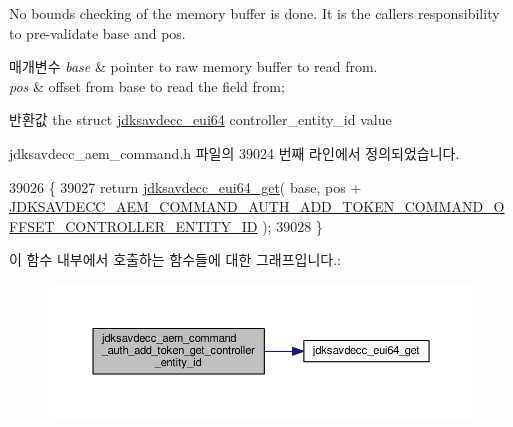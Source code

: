 No bounds checking of the memory buffer is done. It is the caller\textquotesingle{}s responsibility to pre-\/validate base and pos.


\begin{DoxyParams}{매개변수}
{\em base} & pointer to raw memory buffer to read from. \\
\hline
{\em pos} & offset from base to read the field from; \\
\hline
\end{DoxyParams}
\begin{DoxyReturn}{반환값}
the struct \hyperlink{structjdksavdecc__eui64}{jdksavdecc\+\_\+eui64} controller\+\_\+entity\+\_\+id value 
\end{DoxyReturn}


jdksavdecc\+\_\+aem\+\_\+command.\+h 파일의 39024 번째 라인에서 정의되었습니다.


\begin{DoxyCode}
39026 \{
39027     \textcolor{keywordflow}{return} \hyperlink{group__eui64_ga2652311a25a6b91cddbed75c108c7031}{jdksavdecc\_eui64\_get}( base, pos + 
      \hyperlink{group__command__auth__add__token_gaee3b9ca9389a138bf3ec167c06e49c0e}{JDKSAVDECC\_AEM\_COMMAND\_AUTH\_ADD\_TOKEN\_COMMAND\_OFFSET\_CONTROLLER\_ENTITY\_ID}
       );
39028 \}
\end{DoxyCode}


이 함수 내부에서 호출하는 함수들에 대한 그래프입니다.\+:
\nopagebreak
\begin{figure}[H]
\begin{center}
\leavevmode
\includegraphics[width=350pt]{group__command__auth__add__token_gadc5f9a5ce876a8fb2969c787ee7b2645_cgraph}
\end{center}
\end{figure}


